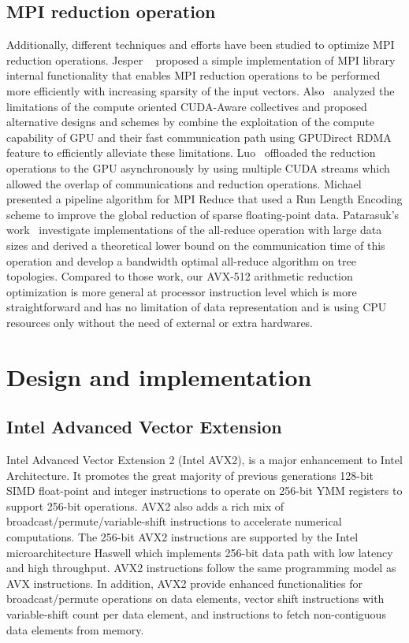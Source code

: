 \documentclass[sigconf]{acmart}
\newcommand{\mpi}[0]{\textsc{MPI}\xspace}
\begin{document}
\subsection{\mpi reduction operation}
Additionally, different techniques and
efforts have been studied to optimize \mpi reduction operations. Jesper
~\cite{Neutral_MPI_Reduction} proposed a simple implementation of MPI library
internal functionality that enables MPI reduction operations to be performed
more efficiently with increasing sparsity of the input vectors.
%
Also~\cite{gpu-reduce} analyzed the limitations of the compute oriented CUDA-Aware
collectives and proposed alternative designs and schemes by combine the exploitation of the
compute capability of GPU and their fast communication
path using GPUDirect RDMA feature to efficiently alleviate these limitations.
%
Luo~\cite{Luo-adapt} offloaded the reduction operations to the GPU asynchronously by
using multiple CUDA streams which allowed the overlap of communications and reduction operations.
Michael~\cite{sparse-reduction} presented a pipeline algorithm for MPI Reduce
that used a Run Length Encoding scheme to improve the global reduction of sparse
floating-point data.
Patarasuk's work~\cite{all-reduce09} investigate implementations of the all-reduce operation
with large data sizes and derived a theoretical lower bound on the communication time of this operation and develop
a bandwidth optimal all-reduce algorithm on tree topologies.
Compared to those work, our AVX-512 arithmetic reduction
optimization is more general at processor instruction level which is more
straightforward and has no limitation of data representation and is using CPU resources only
without the need of external or extra hardwares.

\section{Design and implementation}\label{sec:design}
\subsection{Intel Advanced Vector Extension}
Intel Advanced Vector Extension 2 (Intel AVX2), is a major enhancement to Intel Architecture.
It promotes the great majority of previous generations 128-bit SIMD float-point and integer instructions
to operate on 256-bit YMM registers to support 256-bit operations.
AVX2 also adds a rich mix of broadcast/permute/variable-shift instructions to accelerate
numerical computations. The 256-bit AVX2 instructions are supported by the Intel microarchitecture
Haswell which implements 256-bit data path with low latency and high throughput.
AVX2 instructions follow the same programming model as AVX instructions.
In addition, AVX2 provide enhanced functionalities for broadcast/permute operations on data elements,
vector shift instructions with variable-shift count per data element,
and instructions to fetch non-contiguous data elements from memory.
\end{document}
